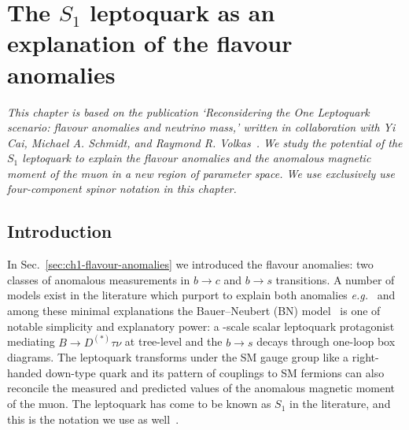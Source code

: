 \graphicspath{{img/chapter_3/}}


\chapter{The $S_{1}$ leptoquark as an explanation of the flavour anomalies}
\label{chapter:the-one-lq}

\begin{flushleft}
  \textit{This chapter is based on the publication `Reconsidering the One
    Leptoquark scenario: flavour anomalies and neutrino mass,' written in
    collaboration with Yi Cai, Michael A. Schmidt, and Raymond R.
    Volkas~\cite{Cai:2017wry}. We study the potential of the $S_{1}$ leptoquark
    to explain the flavour anomalies and the anomalous magnetic moment of the
    muon in a new region of parameter space. We use exclusively use
    four-component spinor notation in this chapter.}
\end{flushleft}

\section{Introduction}

In Sec.~\ref{sec:ch1-flavour-anomalies} we introduced the flavour anomalies: two
classes of anomalous measurements in $b \to c$ and $b \to s$ transitions. A
number of models exist in the literature which purport to explain both anomalies
\textit{e.g.}~\cite{Alonso:2015sja, Bauer:2015knc, Becirevic:2016oho,
  Becirevic:2016yqi, Boucenna:2016wpr, Boucenna:2016qad, Calibbi:2015kma,
  Crivellin:2017zlb, Deppisch:2016qqd, Deshpand:2016cpw, Fajfer:2015ycq,
  Feruglio:2016gvd, Feruglio:2017rjo, Megias:2017ove,
  Popov:2016fzr,Becirevic:2015asa, Becirevic:2017jtw, Buras:2013qja,
  Freytsis:2015qca, Gauld:2013qba, Glashow:2014iga, Gripaios:2014tna,
  Hiller:2014ula, Hiller:2014yaa, Mahmoudi:2014mja, Megias:2016bde, Pas:2015hca,
  Sahoo:2015fla, Sahoo:2015qha, Sakaki:2013bfa, Sierra:2015fma,
  Varzielas:2015iva, deBoer:2015boa} and among these minimal explanations the
Bauer--Neubert (BN) model~\cite{Bauer:2015knc} is one of notable simplicity and
explanatory power: a \TeV-scale scalar leptoquark protagonist mediating
$B \rightarrow D^{(*)} \tau \nu$ at tree-level and the $b \rightarrow s$ decays
through one-loop box diagrams. The leptoquark transforms under the SM gauge
group like a right-handed down-type quark and its pattern of couplings to SM
fermions can also reconcile the measured and predicted values of the anomalous
magnetic moment of the muon. The leptoquark has come to be known as $S_{1}$ in
the literature, and this is the notation we use as well~\cite{Dorsner:2016wpm}.

